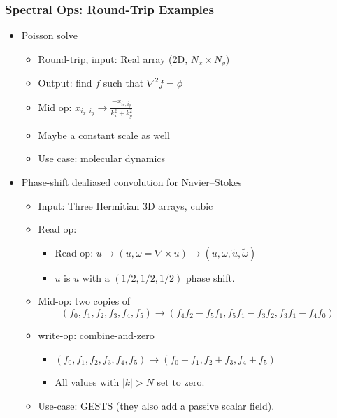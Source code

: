 \documentclass[10pt,aspectratio=169]{beamer}
\def\({\left(}
\def\){\right)}
\begin{document}
\begin{frame}
  \frametitle{Spectral Ops: Round-Trip Examples}

  \begin{itemize}

   \item Poisson solve
    \begin{itemize}
    \item Round-trip, input: Real array (2D, $N_x\times{}N_y$)
    \item Output: find $f$ such that $\nabla^2{f} = \phi$
    \item Mid op: $x_{i_x, i_y} \rightarrow \frac{-x_{i_x, i_y} }{ k_x^2 + k_y^2}$
    \item Maybe a constant scale as well
    \item Use case: molecular dynamics
    \end{itemize}
  \item Phase-shift dealiased convolution for Navier--Stokes
    \begin{itemize}
    \item Input: Three Hermitian 3D arrays, cubic
    \item Read op:
      \begin{itemize}
      \item Read-op:
        $u
          \rightarrow \(u, \omega = \nabla \times u\)
          \rightarrow \(u, \omega, \tilde{u}, \tilde{\omega}\)
          $
        \item $\tilde{u}$ is $u$ with a $\(1/2, 1/2, 1/2\)$ phase shift.
      \end{itemize}
    \item Mid-op: two copies of 
      \begin{dmath}
        \(f_0, f_1, f_2, f_3, f_4, f_5\)
        \rightarrow
        \(
        f_4 f_2 - f_5 f_1,
        f_5 f_1 - f_3 f_2,
        f_3 f_1 - f_4 f_0
        \)
      \end{dmath}
    \item write-op: combine-and-zero
      \begin{itemize}
      \item $\(f_0, f_1, f_2, f_3, f_4, f_5\)
        \rightarrow
        \(f_0 + f_1, f_2 + f_3, f_4 + f_5 \)$
      \item All values with $\left|k\right| > N$ set to zero.
      \end{itemize}
    \item Use-case: GESTS (they also add a passive scalar field).
    \end{itemize}
  \end{itemize}
  
\end{frame}
\end{document}
